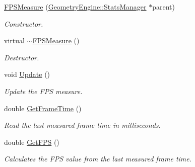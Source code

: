 \begin{DoxyCompactItemize}
\item 
\mbox{\label{class_geometry_engine_1_1_geometry_statistics_1_1_f_p_s_measure_ab64a1b8dda77ae59c26500a206e537c8}} 
\mbox{\hyperlink{class_geometry_engine_1_1_geometry_statistics_1_1_f_p_s_measure_ab64a1b8dda77ae59c26500a206e537c8}{F\+P\+S\+Measure}} (\mbox{\hyperlink{class_geometry_engine_1_1_stats_manager}{Geometry\+Engine\+::\+Stats\+Manager}} $\ast$parent)
\begin{DoxyCompactList}\small\item\em Constructor. \end{DoxyCompactList}\item 
\mbox{\label{class_geometry_engine_1_1_geometry_statistics_1_1_f_p_s_measure_ad090bb89ad6735357cb6afd26bdf9b67}} 
virtual \mbox{\hyperlink{class_geometry_engine_1_1_geometry_statistics_1_1_f_p_s_measure_ad090bb89ad6735357cb6afd26bdf9b67}{$\sim$\+F\+P\+S\+Measure}} ()
\begin{DoxyCompactList}\small\item\em Destructor. \end{DoxyCompactList}\item 
\mbox{\label{class_geometry_engine_1_1_geometry_statistics_1_1_f_p_s_measure_af37048cac708cc417dd42a8641b90d6e}} 
void \mbox{\hyperlink{class_geometry_engine_1_1_geometry_statistics_1_1_f_p_s_measure_af37048cac708cc417dd42a8641b90d6e}{Update}} ()
\begin{DoxyCompactList}\small\item\em Update the F\+PS measure. \end{DoxyCompactList}\item 
\mbox{\label{class_geometry_engine_1_1_geometry_statistics_1_1_f_p_s_measure_ac645a9506a11f939a81009adbf86d9ec}} 
double \mbox{\hyperlink{class_geometry_engine_1_1_geometry_statistics_1_1_f_p_s_measure_ac645a9506a11f939a81009adbf86d9ec}{Get\+Frame\+Time}} ()
\begin{DoxyCompactList}\small\item\em Read the last measured frame time in milliseconds. \end{DoxyCompactList}\item 
\mbox{\label{class_geometry_engine_1_1_geometry_statistics_1_1_f_p_s_measure_a9d94c3f7eac40f099794933e2785e440}} 
double \mbox{\hyperlink{class_geometry_engine_1_1_geometry_statistics_1_1_f_p_s_measure_a9d94c3f7eac40f099794933e2785e440}{Get\+F\+PS}} ()
\begin{DoxyCompactList}\small\item\em Calculates the F\+PS value from the last measured frame time. \end{DoxyCompactList}\end{DoxyCompactItemize}
